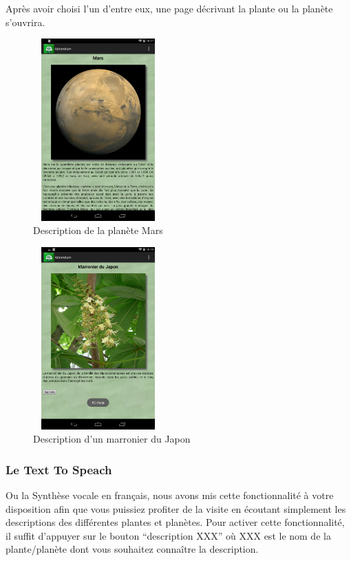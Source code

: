 \documentclass[a4paper,11pt]{article}
\begin{document}
    Après avoir choisi l'un d'entre eux, une page décrivant la plante ou la planète s'ouvrira.
    \begin{figure}[H]
     \begin{center}
      \includegraphics[width=5cm,height=7cm]{mars.png}
    \caption{Description de la planète Mars}
     \end{center}
    \end{figure}
    
    \begin{figure}[H]
     \begin{center}
      \includegraphics[width=5cm,height=7cm]{marronier.png}
    \caption{Description d'un marronier du Japon}
     \end{center}
    \end{figure}
    
    \subsubsection*{Le Text To Speach}
    Ou la Synthèse vocale en français, nous avons mis cette fonctionnalité à votre disposition afin que vous puissiez profiter de la visite
    en écoutant simplement les descriptions des différentes plantes et planètes. Pour activer cette fonctionnalité, il suffit d'appuyer sur le bouton
    ``description XXX'' où XXX est le nom de la plante/planète dont vous souhaitez connaître la description.
    
\end{document}
